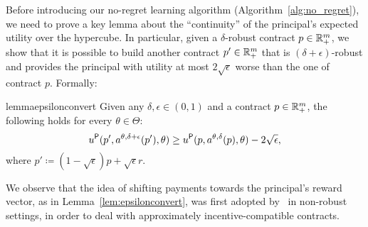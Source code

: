 Before introducing our no-regret learning algorithm (Algorithm~\ref{alg:no_regret}), we need to prove a key lemma about the ``continuity'' of the principal's expected utility over the hypercube.
%
In particular, given a $\delta$-robust contract $p \in \mathbb{R}^{m}_{+}$, we show that it is possible to build another contract $p'\in  \mathbb{R}^{m}_{+}$ that is $(\delta + \epsilon)$-robust and provides the principal with utility at most $2\sqrt{\epsilon}$ worse than the one of contract $p$. Formally:
%
\begin{restatable}{lemma}{epsilonconvert}\label{lem:epsilonconvert}
	Given any $\delta,\epsilon \in(0,1)$ and a contract $p \in \mathbb{R}^{m}_{+}$, the following holds for every $\theta \in \Theta$:
	$$ u^{\mathsf{P}}(p', a^{\theta, \delta+\epsilon}(p'),\theta) \ge u^{\mathsf{P}}(p,a^{\theta,\delta} (p),\theta ) - 2 \sqrt{\epsilon},$$
	where $p' \coloneqq (1-\sqrt \epsilon)p + \sqrt \epsilon r$.
\end{restatable}
%
%
%
%
%
%
%
%
We observe that the idea of shifting payments towards the principal's reward vector, as in Lemma~\ref{lem:epsilonconvert}, was first adopted by~\citet{dutting2021complexity} in non-robust settings, in order to deal with approximately incentive-compatible contracts.

